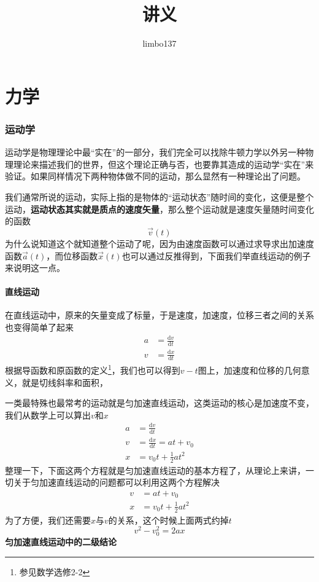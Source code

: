 \documentclass[hyperref,UTF8]{ctexart}
\title{讲义}
\author{limbo137}
\newcommand{\D}{\mathrm{d}}
\begin{document}
\maketitle
\part{力学}
\section{运动学}
运动学是物理理论中最“实在”的一部分，我们完全可以找除牛顿力学以外另一种物理理论来描述我们的世界，但这个理论正确与否，也要靠其造成的运动学“实在”来验证。如果同样情况下两种物体做不同的运动，那么显然有一种理论出了问题。

我们通常所说的运动，实际上指的是物体的“运动状态”随时间的变化，这便是整个运动，\textbf{运动状态其实就是质点的速度矢量}，那么整个运动就是速度矢量随时间变化的函数
\[\vec{v}(t)\]
为什么说知道这个就知道整个运动了呢，因为由速度函数可以通过求导求出加速度函数$\vec{a}(t)$，而位移函数$\vec{x}(t)$也可以通过反推得到，下面我们举直线运动的例子来说明这一点。
\subsection{直线运动}
在直线运动中，原来的矢量变成了标量，于是速度，加速度，位移三者之间的关系也变得简单了起来
\begin{align*}
    a &= \frac{\D v}{\D t} \\
    v &= \frac{\D x}{\D t}
\end{align*}
根据导函数和原函数的定义\footnote{参见数学选修2-2}，我们也可以得到$v-t$图上，加速度和位移的几何意义，就是切线斜率和面积，

一类最特殊也最常考的运动就是匀加速直线运动，这类运动的核心是加速度不变，我们从数学上可以算出$v$和$x$
\begin{align*}
    a &= \frac{\D v}{\D t} \\
    v &= \frac{\D x}{\D t} =a t + v_0\\
    x &= v_0 t + \frac12 a t^2
\end{align*}
整理一下，下面这两个方程就是匀加速直线运动的基本方程了，从理论上来讲，一切关于匀加速直线运动的问题都可以利用这两个方程解决
\begin{equation}
    \begin{split}
        v &=a t + v_0\\
        x &= v_0 t + \frac12 a t^2
    \end{split}
\end{equation}
为了方便，我们还需要$x$与$v$的关系，这个时候上面两式约掉$t$
\begin{equation}
    v^2-v_0^2=2ax
\end{equation}
\textbf{匀加速直线运动中的二级结论}
\end{document}
